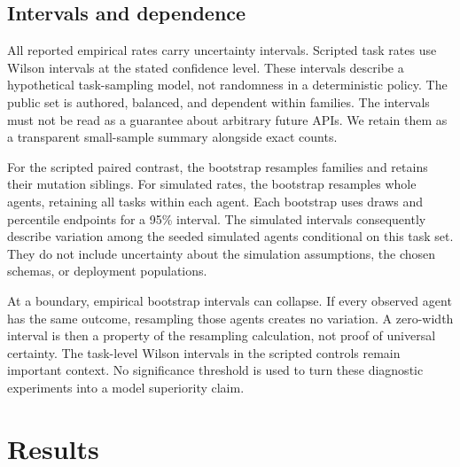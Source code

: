 \documentclass{article}
\begin{document}
\subsection{Intervals and dependence}
All reported empirical rates carry uncertainty intervals. Scripted task rates use Wilson intervals at the stated confidence level. These intervals describe a hypothetical task-sampling model, not randomness in a deterministic policy. The public set is authored, balanced, and dependent within families. The intervals must not be read as a guarantee about arbitrary future APIs. We retain them as a transparent small-sample summary alongside exact counts.\par
For the scripted paired contrast, the bootstrap resamples families and retains their mutation siblings. For simulated rates, the bootstrap resamples whole agents, retaining all tasks within each agent. Each bootstrap uses \BootstrapDraws{} draws and percentile endpoints for a 95\% interval. The simulated intervals consequently describe variation among the seeded simulated agents conditional on this task set. They do not include uncertainty about the simulation assumptions, the chosen schemas, or deployment populations.\par
At a boundary, empirical bootstrap intervals can collapse. If every observed agent has the same outcome, resampling those agents creates no variation. A zero-width interval is then a property of the resampling calculation, not proof of universal certainty. The task-level Wilson intervals in the scripted controls remain important context. No significance threshold is used to turn these diagnostic experiments into a model superiority claim.\par
\section{Results}
\end{document}
